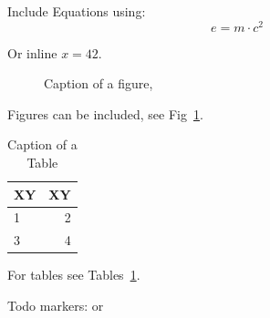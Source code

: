 \documentclass{expose} %
\begin{document}
Include Equations using:
\[ e = m \cdot c^2 \]

Or inline $x=42$.

\begin{figure}[tbh!]
\centering
\caption{Caption of a figure, }
\label{pic::example1}
\end{figure}
Figures can be included, see Fig~\ref{pic::example1}.


\begin{table}[h]
\centering
\caption{Caption of a Table}
\label{tbl::example1}
\begin{tabular}{lr}
\toprule
\textbf{XY}  & \textbf{XY} \\
\midrule
1   & 2 \\
\midrule
3 & 4 \\
\bottomrule
\end{tabular}
\end{table}

For tables see Tables~\ref{tbl::example1}.

Todo markers: 
or 


\cite[p.12]{Berlin}

{
\renewcommand{\emph}[1]{\textit{#1}}
\sloppy
\printbibliography
}

\clearpage

\end{document}
